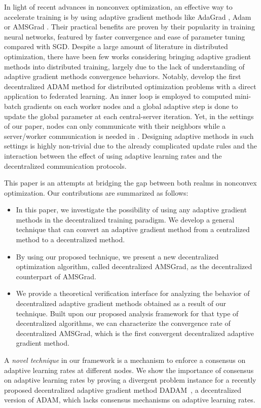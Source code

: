 \documentclass{article} %
\begin{document}
In light of recent advances in nonconvex optimization, an effective way to accelerate training is by using adaptive gradient methods like AdaGrad \citep{duchi2011adaptive}, Adam \citep{kingma2014adam} or AMSGrad \citep{reddi2019convergence}. 
Their practical benefits are proven by their popularity in training neural networks, featured by faster convergence and ease of parameter tuning compared with SGD.
Despite a large amount of literature in distributed optimization, there have been few works considering bringing adaptive gradient methods into distributed training, largely due to the lack of understanding of adaptive gradient methods convergence behaviors. 
Notably, \citet{reddi2020adaptive} develop the first decentralized ADAM method for distributed optimization problems with a direct application to federated learning.
An inner loop is employed to computed mini-batch gradients on each worker nodes and a global adaptive step is done to update the global parameter at each central-server iteration.
Yet, in the settings of our paper, nodes can only communicate with their neighbors while a server/worker communication is needed in \citep{reddi2020adaptive}.
Designing adaptive methods in such settings is highly non-trivial due to the already complicated update rules and the interaction between the effect of using adaptive learning rates and the decentralized communication protocols.

This paper is an attempts at bridging the gap between both realms in nonconvex optimization. 
Our contributions are summarized as follows:
\begin{itemize}
\item In this paper, we investigate the possibility of using any adaptive gradient methods in the decentralized training paradigm. We develop a general technique that can convert an adaptive gradient method from a centralized method to a decentralized method.
\item By using our proposed technique, we present a new decentralized optimization algorithm, called decentralized AMSGrad, as the decentralized counterpart of AMSGrad.
\item We provide a theoretical verification interface for analyzing the behavior of decentralized adaptive gradient methods obtained as a result of our technique.
Built upon our proposed analysis framework for that type of decentralized algorithms, we can characterize the convergence rate of decentralized AMSGrad, which is the first convergent decentralized adaptive gradient method.
\end{itemize}
A \emph{novel technique} in our framework is a mechanism to enforce a consensus on adaptive learning rates at different nodes. 
We show the importance of consensus on adaptive learning rates by proving a divergent problem instance for a recently proposed decentralized adaptive gradient method DADAM~\citep{nazari2019dadam}, a decentralized version of ADAM, which lacks consensus mechanisms on adaptive learning rates.
\end{document}
